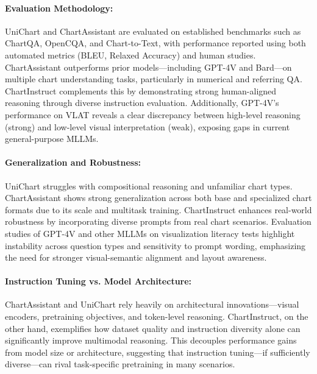 \documentclass[11pt]{article}
\begin{document}
\paragraph{Evaluation Methodology:}
UniChart and ChartAssistant are evaluated on established benchmarks such as ChartQA, OpenCQA, and Chart-to-Text, with performance reported using both automated metrics (BLEU, Relaxed Accuracy) and human studies. ChartAssistant outperforms prior models—including GPT-4V and Bard—on multiple chart understanding tasks, particularly in numerical and referring QA. ChartInstruct complements this by demonstrating strong human-aligned reasoning through diverse instruction evaluation. Additionally, GPT-4V’s performance on VLAT reveals a clear discrepancy between high-level reasoning (strong) and low-level visual interpretation (weak), exposing gaps in current general-purpose MLLMs.

\paragraph{Generalization and Robustness:}
UniChart struggles with compositional reasoning and unfamiliar chart types. ChartAssistant shows strong generalization across both base and specialized chart formats due to its scale and multitask training. ChartInstruct enhances real-world robustness by incorporating diverse prompts from real chart scenarios. Evaluation studies of GPT-4V and other MLLMs on visualization literacy tests highlight instability across question types and sensitivity to prompt wording, emphasizing the need for stronger visual-semantic alignment and layout awareness.

\paragraph{Instruction Tuning vs. Model Architecture:}
ChartAssistant and UniChart rely heavily on architectural innovations—visual encoders, pretraining objectives, and token-level reasoning. ChartInstruct, on the other hand, exemplifies how dataset quality and instruction diversity alone can significantly improve multimodal reasoning. This decouples performance gains from model size or architecture, suggesting that instruction tuning—if sufficiently diverse—can rival task-specific pretraining in many scenarios.
\end{document}

